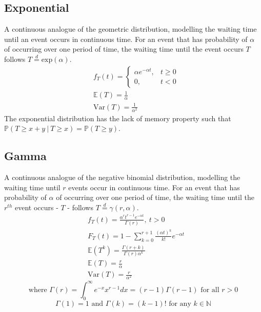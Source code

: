 \documentclass[titlepage,twocolumn]{article}
\begin{document}
\subsection*{Exponential}
A continuous analogue of the geometric distribution, modelling the waiting time until an event occurs in continuous time. For an event that has probability of $\alpha$ of occurring over one period of time, the waiting time until the event occurs $T$ follows $T\stackrel{d}{=}\mbox{exp}(\alpha)$.
\begin{align*}
    &f_T(t)=\begin{cases} \alpha e^{-\alpha t}, & t \geq 0 \\ 0, & t < 0 \end{cases}\\
    &\mathbb{E}(T)=\frac{1}{\alpha}\\
    &\mbox{Var}(T)=\frac{1}{\alpha ^2}
\end{align*}
The exponential distribution has the lack of memory property such that $\mathbb{P}(T \geq x+y\ |\ T \geq x) = \mathbb{P}(T \geq y)$.
\vfill
\subsection*{Gamma}
A continuous analogue of the negative binomial distribution, modelling the waiting time until $r$ events occur in continuous time. For an event that has probability of $\alpha$ of occurring over one period of time, the waiting time until the $r^{th}$ event occurs - $T$ - follows $T\stackrel{d}{=} \gamma(r, \alpha)$.
\begin{align*}
    &f_T(t)=\frac{\alpha^r t^{r-1} e^{-\alpha t}}{\Gamma(r)},\ t > 0\\
    &F_T(t)=1-\sum_{k=0}^{r+1}\frac{(\alpha t)^k}{k!}e^{-\alpha t}\\
    &\mathbb{E}(T^k)=\frac{\Gamma(r+k)}{\Gamma(r)\alpha^k}\\
    &\mathbb{E}(T)=\frac{r}{\alpha}\\
    &\mbox{Var}(T)=\frac{r}{\alpha ^2}
\end{align*}
$$\mbox{where }\Gamma(r) = \int_0^\infty e^{-x}x^{r-1} dx = (r-1)\Gamma(r-1) \mbox{ for all } r > 0$$
$$\Gamma(1) = 1 \mbox{ and } \Gamma(k) = (k-1)! \mbox{ for any } k \in \mathbb{N}$$
\end{document}
